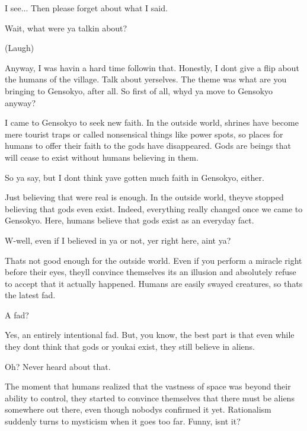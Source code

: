\begin{tcolorbox}[breakable, colback=white, colframe=black!80,
  boxrule=0.6pt, arc=0mm, left=3mm, right=3mm, top=2mm, bottom=2mm]
\medskip
I see... Then please forget about what I said.\par
\medskip
Wait, what were ya talkin\textquotesingle{} about?\par
\medskip
(Laugh)\par
{}\par
\medskip
Anyway, I was havin\textquotesingle{} a hard time followin\textquotesingle{} that. Honestly, I don\textquotesingle{}t give a flip about the humans of the village. Talk about yerselves. The theme was \textquotedbl{}what are you bringing to Gensokyo\textquotedbl{}, after all. So first of all, why\textquotesingle{}d ya move to Gensokyo anyway?\par
\medskip
I came to Gensokyo to seek new faith. In the outside world, shrines have become mere tourist traps or called nonsensical things like \textquotedbl{}power spots\textquotedbl{}, so places for humans to offer their faith to the gods have disappeared. Gods are beings that will cease to exist without humans believing in them.\par
\medskip
So ya say, but I don\textquotesingle{}t think ya\textquotesingle{}ve gotten much faith in Gensokyo, either.\par
\medskip
Just believing that we\textquotesingle{}re real is enough. In the outside world, they\textquotesingle{}ve stopped believing that gods even exist. Indeed, everything really changed once we came to Gensokyo. Here, humans believe that gods exist as an everyday fact.\par
\medskip
W-{}well, even if I believed in ya or not, yer right here, ain\textquotesingle{}t ya?\par
\medskip
That\textquotesingle{}s not good enough for the outside world. Even if you perform a miracle right before their eyes, they\textquotesingle{}ll convince themselves it\textquotesingle{}s an illusion and absolutely refuse to accept that it actually happened. Humans are easily swayed creatures, so that\textquotesingle{}s the latest fad.\par
\medskip
A fad?\par
\medskip
Yes, an entirely intentional fad. But, you know, the best part is that even while they don\textquotesingle{}t think that gods or youkai exist, they still believe in aliens.\par
\medskip
Oh? Never heard about that.\par
\medskip
The moment that humans realized that the vastness of space was beyond their ability to control, they started to convince themselves that there must be aliens somewhere out there, even though nobody\textquotesingle{}s confirmed it yet. Rationalism suddenly turns to mysticism when it goes too far. Funny, isn\textquotesingle{}t it?\par

\end{tcolorbox}
